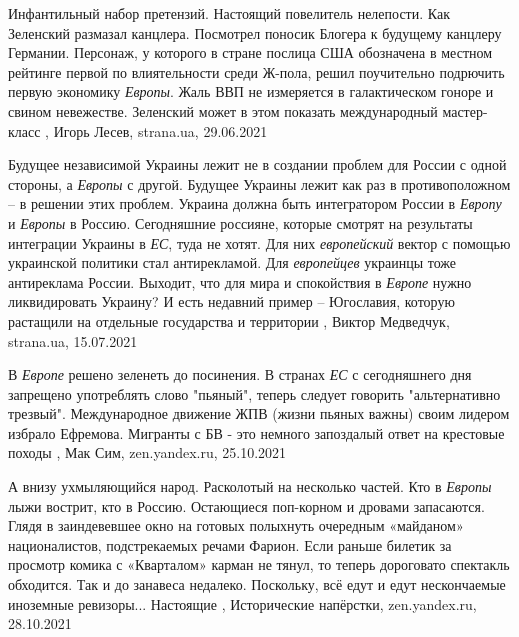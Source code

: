 Инфантильный набор претензий. Настоящий повелитель нелепости.  Как Зеленский
размазал канцлера.  Посмотрел поносик Блогера к будущему канцлеру Германии.
Персонаж, у которого в стране послица США обозначена в местном рейтинге первой
по влиятельности среди Ж-пола, решил поучительно подрючить первую экономику
\emph{Европы}. Жаль ВВП не измеряется в галактическом гоноре и свином
невежестве. Зеленский может в этом показать международный мастер-класс
, 
Игорь Лесев, strana.ua, 29.06.2021

Будущее независимой Украины лежит не в создании проблем для России с одной
стороны, а \emph{Европы} с другой. Будущее Украины лежит как раз в противоположном – в
решении этих проблем. Украина должна быть интегратором России в \emph{Европу} и \emph{Европы}
в Россию. Сегодняшние россияне, которые смотрят на результаты интеграции
Украины в \emph{ЕС}, туда не хотят. Для них \emph{европейский} вектор с помощью украинской
политики стал антирекламой.  Для \emph{европейцев} украинцы тоже антиреклама России.
Выходит, что для мира и спокойствия в \emph{Европе} нужно ликвидировать Украину? И
есть недавний пример – Югославия, которую растащили на отдельные государства и
территории
, 
Виктор Медведчук, strana.ua, 15.07.2021

В \emph{Европе} решено зеленеть до посинения.  В странах \emph{ЕС} с сегодняшнего дня
запрещено употреблять слово "пьяный", теперь следует говорить "альтернативно
трезвый". Международное движение ЖПВ (жизни пьяных важны) своим лидером избрало
Ефремова.  Мигранты с БВ - это немного запоздалый ответ на крестовые походы
, Мак Сим, zen.yandex.ru, 25.10.2021

А внизу ухмыляющийся народ. Расколотый на несколько частей. Кто в \emph{Европы} лыжи
вострит, кто в Россию. Остающиеся поп-корном и дровами запасаются. Глядя в
заиндевевшее окно на готовых полыхнуть очередным «майданом» националистов,
подстрекаемых речами Фарион. Если раньше билетик за просмотр комика с
«Кварталом» карман не тянул, то теперь дороговато спектакль обходится. Так и до
занавеса недалеко. Поскольку, всё едут и едут нескончаемые иноземные ревизоры...
Настоящие
, 
Исторические напёрстки, zen.yandex.ru, 28.10.2021

